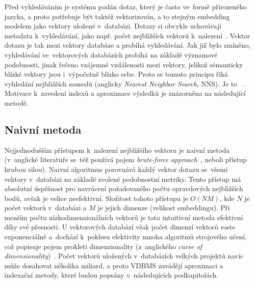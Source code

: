 Před vyhledáváním je systému podán dotaz, který je často ve~formě přirozeného jazyka, a proto potřebuje být taktéž vektorizován, a to stejným embedding modelem jako vektory uložené v~databázi. Dotazy si obvykle uchovávají metadata k~vyhledávání, jako např. počet nejbližších vektorů k~nalezení~\cite{Taipalus_2024}. Vektor dotazu je tak  mezi vektory databáze a probíhá vyhledávání. Jak již bylo zmíněno, vyhledávání ve~vektorových databázích probíhá na základě významové podobnosti, jinak řečeno vzájemné vzdálenosti mezi vektory, jelikož sémanticky blízké vektory jsou i~výpočetně blízko sebe. Proto se tomuto principu říká vyhledání nejbližších sousedů (anglicky \textit{Nearest Neighbor Search}, NNS). Je to ~\cite{han2023_vector_database}. Motivace k~zavedení indexů a aproximace výsledků je znázorněna na následující metodě.

\subsection{Naivní metoda}
Nejjednodušším přístupem k~nalezení nejbližšího vektoru je naivní metoda (v~anglické literatuře se~též používá pojem \textit{brute-force approach}~\cite{han2023_vector_database}, neboli přístup hrubou silou).
Naivní algoritmus porovnává každý vektor dotazu se~všemi vektory v~databázi na základě zvolené podobnostní metriky. Tento přístup má absolutní úspěšnost pro navrácení požadovaného počtu opravdových nejbližších bodů, avšak je velice neefektivní. Složitost tohoto přístupu je $O(NM)$, kde $N$ je počet vektorů v~databázi a $M$ je jejich dimenze (velikost embeddingu). Při menším počtu nízkodimenzionálních vektorů je tato intuitivní metoda efektivní díky své přesnosti. U vektorových databází však počet dimenzí vektorů roste exponenciálně a~dochází k~poklesu efektivity mnoha algoritmů strojového učení, což popisuje pojem prokletí dimenzionality (z~anglického \textit{curse of dimensionality})~\cite{peng2024_curse_dimensionality}. Počet vektorů uložených v~databázích velkých projektů navíc může dosahovat několika miliard, a proto VDBMS zavádějí aproximaci a indexační metody, které budou popsány v~následujících podkapitolách.

